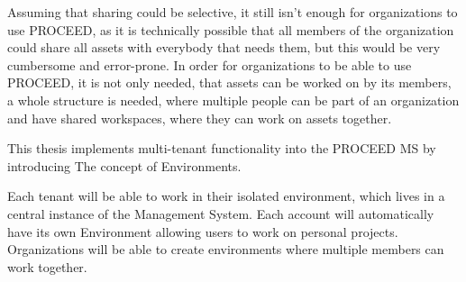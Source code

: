 Assuming that sharing could be selective, it still isn't enough for organizations to use
PROCEED, as it is technically possible that all members of the organization could share
all assets with everybody that needs them, but this would be very cumbersome and
error-prone.
In order for organizations to be able to use PROCEED, it is not only needed, that assets can be
worked on by its members, a whole structure is needed, where multiple people can be part
of an organization and have shared workspaces, where they can work on assets together.

This thesis implements multi-tenant functionality into the PROCEED MS by introducing The concept of Environments. 

Each tenant will be able to work in their isolated environment, which lives in a central instance of the Management System. 
Each account will automatically have its own Environment allowing users to work on
personal projects. 
Organizations will be able to create environments where multiple members can work together.


